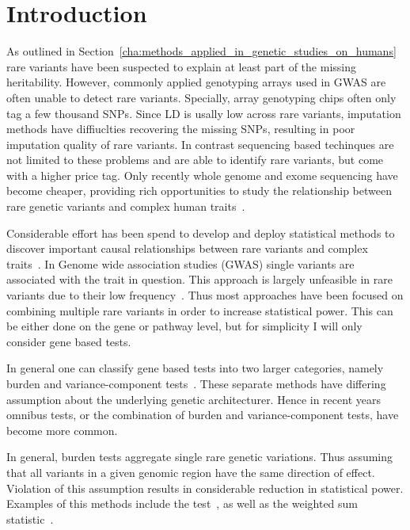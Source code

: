 \section{Introduction}
\label{sec:introduction}

As outlined in Section~\ref{cha:methods_applied_in_genetic_studies_on_humans} rare variants have been suspected to explain at least part of the missing heritability.
However, commonly applied genotyping arrays used in GWAS are often unable to detect rare variants.
Specially, array genotyping chips often only tag a few thousand SNPs.
Since LD is usally low across rare variants, imputation methods have diffiuclties recovering the missing SNPs, resulting in poor imputation quality of rare variants.
In contrast sequencing based techinques are not limited to these problems and are able to identify rare variants, but come with a higher price tag.
Only recently whole genome and exome sequencing have become cheaper, providing rich opportunities to study the relationship between rare genetic variants and complex human traits~\cite{Goodwin2016}.

Considerable effort has been spend to develop and deploy statistical methods to discover important causal relationships between rare variants and complex traits~\cite{Morris2010,Zeng2014,Daye2012,Manuscript2013}.
In Genome wide association studies (GWAS) single variants are associated with the trait in question.
This approach is largely unfeasible in rare variants due to their low frequency~\cite{Lee2014}.
Thus most approaches have been focused on combining multiple rare variants in order to increase statistical power.
This can be either done on the gene or pathway level, but for simplicity I will only consider gene based tests.

In general one can classify gene based tests into two larger categories, namely burden and variance-component tests~\cite{Lee2014}.
These separate methods have differing assumption about the underlying genetic architecturer.
Hence in recent years omnibus tests, or the combination of burden and variance-component tests, have become more common.

In general, burden tests aggregate single rare genetic variations.
Thus assuming that all variants in a given genomic region have the same direction of effect.
Violation of this assumption results in considerable reduction in statistical power.
Examples of this methods include the  test~\cite{Li2008}, as well as the weighted sum statistic~\cite{Madsen2009}.

